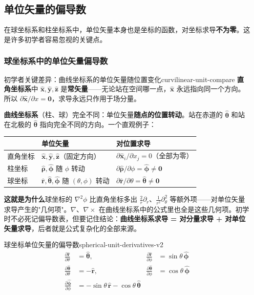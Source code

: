 \documentclass[11pt,a4paper,openany,oneside]{book}
\newcommand{\vect}[1]{\bm{#1}}
\newcommand{\unitvec}[1]{\hat{\vect{#1}}}
\newcommand{\grad}{\nabla}
\newcommand{\curl}{\nabla\times}
\newcommand{\lap}{\nabla^2}
\begin{document}
\subsection{单位矢量的偏导数}

在球坐标系和柱坐标系中，单位矢量本身也是坐标的函数，对坐标求导\textbf{不为零}。这是许多初学者容易忽视的关键点。

\subsubsection{球坐标系中的单位矢量偏导数}

\begin{tip}{初学者关键差异：曲线坐标系的单位矢量随位置变化}{curvilinear-unit-compare}
\textbf{直角坐标系}中 $\unitvec{x}, \unitvec{y}, \unitvec{z}$ 是\textbf{常矢量}——无论站在空间哪一点，$\unitvec{x}$ 永远指向同一个方向。所以 $\partial\unitvec{x}/\partial x = \vect{0}$，求导永远只作用于场分量。

\textbf{曲线坐标系}（柱、球）完全不同：单位矢量\textbf{随点的位置转动}。站在赤道的 $\unitvec{\theta}$ 和站在北极的 $\unitvec{\theta}$ 指向完全不同的方向。一个直观例子：
\begin{center}
\small
\begin{tabular}{@{}lll@{}}
\toprule
 & 单位矢量 & 对位置求导 \\
\midrule
直角坐标 & $\unitvec{x}, \unitvec{y}, \unitvec{z}$（固定方向） & $\partial\unitvec{x}_i/\partial x_j = 0$（全部为零） \\
柱坐标 & $\unitvec{\rho}, \unitvec{\phi}$ 随 $\phi$ 转动 & $\partial\unitvec{\rho}/\partial\phi = \unitvec{\phi} \neq \vect{0}$ \\
球坐标 & $\unitvec{r}, \unitvec{\theta}, \unitvec{\phi}$ 随 $(\theta,\phi)$ 转动 & $\partial\unitvec{r}/\partial\theta = \unitvec{\theta} \neq \vect{0}$ \\
\bottomrule
\end{tabular}
\end{center}

\textbf{这就是为什么}球坐标的 $\lap\phi$ 比直角坐标多出 $\frac{2}{r}\partial_r$、$\frac{1}{r^2}\partial^2_\theta$ 等额外项——对单位矢量求导产生的"几何项"。$\grad$、$\curl$ 在曲线坐标系中的公式里也全是这些几何项。初学时不必死记偏导数表，但要记住结论：\textbf{曲线坐标系求导 = 对分量求导 + 对单位矢量求导}，后者就是公式复杂化的全部来源。
\end{tip}

\begin{theorem}{球坐标单位矢量的偏导数}{spherical-unit-derivatives-v2}
\begin{align*}
\frac{\partial\unitvec{r}}{\partial\theta} &= \unitvec{\theta}, &
\frac{\partial\unitvec{r}}{\partial\phi} &= \sin\theta \, \unitvec{\phi} \\
\frac{\partial\unitvec{\theta}}{\partial\theta} &= -\unitvec{r}, &
\frac{\partial\unitvec{\theta}}{\partial\phi} &= \cos\theta \, \unitvec{\phi} \\
\frac{\partial\unitvec{\phi}}{\partial\phi} &= -\sin\theta \, \unitvec{r} - \cos\theta \, \unitvec{\theta}
\end{align*}
\end{theorem}
\end{document}
